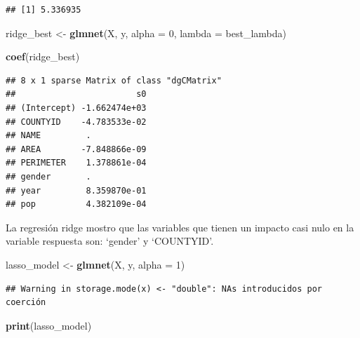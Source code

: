 \documentclass[
  12pt,
]{article}
\newenvironment{Shaded}{\begin{snugshade}}{\end{snugshade}}
\newcommand{\AttributeTok}[1]{\textcolor[rgb]{0.13,0.29,0.53}{#1}}
\newcommand{\DecValTok}[1]{\textcolor[rgb]{0.00,0.00,0.81}{#1}}
\newcommand{\FunctionTok}[1]{\textcolor[rgb]{0.13,0.29,0.53}{\textbf{#1}}}
\newcommand{\NormalTok}[1]{#1}
\newcommand{\OtherTok}[1]{\textcolor[rgb]{0.56,0.35,0.01}{#1}}
\begin{document}
\begin{verbatim}
## [1] 5.336935
\end{verbatim}

\begin{Shaded}
\begin{Highlighting}[]
\NormalTok{ridge\_best }\OtherTok{\textless{}{-}} \FunctionTok{glmnet}\NormalTok{(X, y, }\AttributeTok{alpha =} \DecValTok{0}\NormalTok{, }\AttributeTok{lambda =}\NormalTok{ best\_lambda)}

\FunctionTok{coef}\NormalTok{(ridge\_best)}
\end{Highlighting}
\end{Shaded}

\begin{verbatim}
## 8 x 1 sparse Matrix of class "dgCMatrix"
##                        s0
## (Intercept) -1.662474e+03
## COUNTYID    -4.783533e-02
## NAME         .           
## AREA        -7.848866e-09
## PERIMETER    1.378861e-04
## gender       .           
## year         8.359870e-01
## pop          4.382109e-04
\end{verbatim}

La regresión ridge mostro que las variables que tienen un impacto casi
nulo en la variable respuesta son: `gender' y `COUNTYID'.

\begin{Shaded}
\begin{Highlighting}[]
\NormalTok{lasso\_model }\OtherTok{\textless{}{-}} \FunctionTok{glmnet}\NormalTok{(X, y, }\AttributeTok{alpha =} \DecValTok{1}\NormalTok{)}
\end{Highlighting}
\end{Shaded}

\begin{verbatim}
## Warning in storage.mode(x) <- "double": NAs introducidos por coerción
\end{verbatim}

\begin{Shaded}
\begin{Highlighting}[]
\FunctionTok{print}\NormalTok{(lasso\_model)}
\end{Highlighting}
\end{Shaded}
\end{document}
